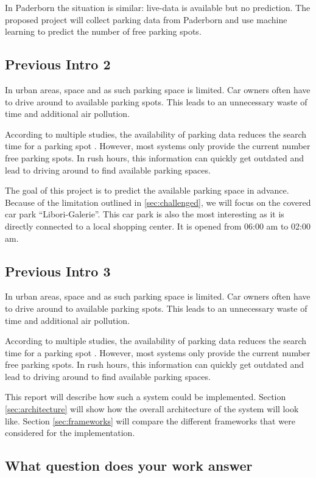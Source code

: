 \documentclass[journal,10pt]{IEEEtran}
\begin{document}
In Paderborn the situation is similar: live-data is available but no prediction. The proposed project will collect parking data from Paderborn and use machine learning to predict the number of free parking spots.

\subsection{Previous Intro 2}
In urban areas, space and as such parking space is limited. Car owners often have to drive around to available parking spots. This leads to an unnecessary waste of time and additional air pollution. 

According to multiple studies, the availability of parking data reduces the search time for a parking spot \cite{Asakura1994}\cite{Caicedo2010228}. However, most systems only provide the current number free parking spots. In rush hours, this information can quickly get outdated and lead to driving around to find available parking spaces.

The goal of this project is to predict the available parking space in advance. Because of the limitation outlined in \ref{sec:challenged}, we will focus on the covered car park ``Libori-Galerie''. This car park is also the most interesting as it is directly connected to a local shopping center. It is opened from 06:00 am to 02:00 am.

\subsection{Previous Intro 3}
In urban areas, space and as such parking space is limited. Car owners often have to drive around to available parking spots. This leads to an unnecessary waste of time and additional air pollution. 

According to multiple studies, the availability of parking data reduces the search time for a parking spot \cite{Asakura1994}\cite{Caicedo2010228}. However, most systems only provide the current number free parking spots. In rush hours, this information can quickly get outdated and lead to driving around to find available parking spaces.

This report will describe how such a system could be implemented. Section \ref{sec:architecture} will show how the overall architecture of the system will look like. Section \ref{sec:frameworks} will compare the different frameworks that were considered for the implementation. 


\subsection{What question does your work answer}
\end{document}
